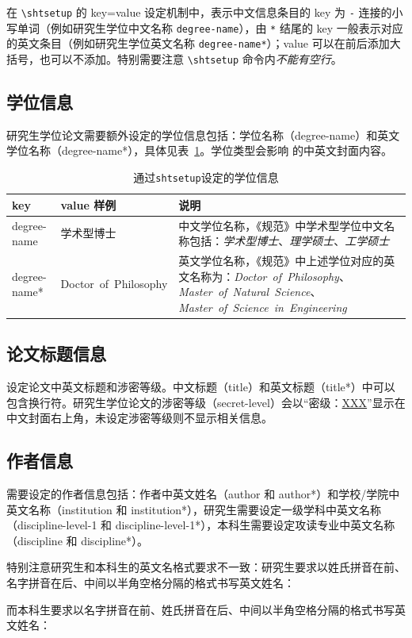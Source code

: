 \documentclass[master]{shtthesis}
\begin{document}
在 \verb|\shtsetup| 的 key=value 设定机制中，表示中文信息条目的 key 为 \verb|-| 连接的小写单词（例如研究生学位中文名称 \verb|degree-name|），由 \verb|*| 结尾的 key 一般表示对应的英文条目（例如研究生学位英文名称 \verb|degree-name*|）；value 可以在前后添加大括号，也可以不添加。特别需要注意 \verb|\shtsetup| 命令内\emph{不能有空行}。

\subsection{学位信息}
研究生学位论文需要额外设定的学位信息包括：学位名称（degree-name）和英文学位名称（degree-name*），具体见表~\ref{tab::degree_info}。学位类型会影响 \shtthesis{} 的中英文封面内容。
\begin{table}[htb]
\centering
\caption{通过\texttt{shtsetup}设定的学位信息} \label{tab::degree_info}
\begin{tabular}{llp{}}
  \toprule
  key & value 样例 & 说明 \\
  \midrule
  degree-name & 学术型博士 & 中文学位名称，《规范》中学术型学位中文名称包括：\emph{学术型博士}、\emph{理学硕士}、\emph{工学硕士} \\
  degree-name* & Doctor~of~Philosophy & 英文学位名称，《规范》中上述学位对应的英文名称为：\emph{Doctor~of~Philosophy}、\emph{Master~of~Natural~Science}、\emph{Master~of~Science~in~Engineering} \\
  \bottomrule
\end{tabular}
\end{table}

\subsection{论文标题信息}
设定论文中英文标题和涉密等级。中文标题（title）和英文标题（title*）中可以包含换行符。研究生学位论文的涉密等级（secret-level）会以“密级：\uline{XXX}”显示在中文封面右上角，未设定涉密等级则不显示相关信息。

\subsection{作者信息}
需要设定的作者信息包括：作者中英文姓名（author 和 author*）和学校/学院中英文名称（institution 和 institution*），研究生需要设定一级学科中英文名称（discipline-level-1 和 discipline-level-1*），本科生需要设定攻读专业中英文名称（discipline 和 discipline*）。

特别注意研究生和本科生的英文名格式要求不一致：研究生要求以姓氏拼音在前、名字拼音在后、中间以半角空格分隔的格式书写英文姓名：
\begin{latex}
\end{latex}
而本科生要求以名字拼音在前、姓氏拼音在后、中间以半角空格分隔的格式书写英文姓名：
\begin{latex}
\end{latex}
\end{document}
